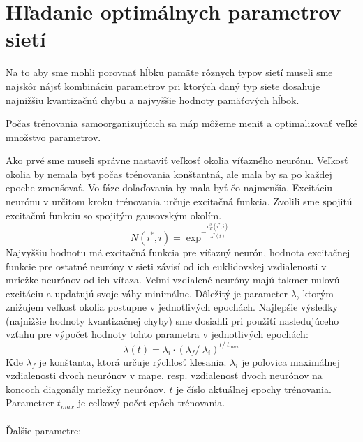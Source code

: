 \section{Hľadanie optimálnych parametrov sietí}
Na to aby sme mohli porovnať hĺbku pamäte rôznych typov sietí museli sme najskôr
nájsť kombináciu parametrov pri ktorých daný typ siete dosahuje najnižšiu kvantizačnú chybu a 
najvyššie hodnoty pamäťových hĺbok. 

Počas trénovania samoorganizujúcich sa máp môžeme meniť a optimalizovať veľké množstvo parametrov. 

Ako prvé sme museli správne nastaviť veľkosť okolia víťazného neurónu.
Veľkosť okolia by nemala byť počas trénovania konštantná, ale mala by sa po každej epoche zmenšovať.
Vo fáze doľaďovania by mala byť čo najmenšia.
Excitáciu neurónu v určitom kroku trénovania určuje excitačná funkcia. Zvolili sme spojitú
excitačnú funkciu so spojitým gausovským okolím. 
\begin{equation}
    N(i^{*}, i) = \exp^{- \frac{d^{2}_{E}(i^{*}, i)}{\lambda^{2}(t)}}
\end{equation}
Najvyššiu hodnotu má excitačná funkcia pre víťazný neurón, hodnota excitačnej funkcie pre ostatné 
neuróny v sieti závisí od ich euklidovskej vzdialenosti v mriežke neurónov od ich víťaza. Veľmi vzdialené neuróny 
majú takmer nulovú excitáciu a updatujú svoje váhy minimálne.
Dôležitý je parameter $\lambda$, ktorým znižujem veľkosť okolia postupne v jednotlivých epochách.
Najlepšie výsledky (najnižšie hodnoty kvantizačnej chyby) sme dosiahli pri použití nasledujúceho vzťahu pre výpočet hodnoty tohto parametra
v jednotlivých epochách:
\begin{equation}
    \lambda{(t)} = \lambda_{i} \cdot (\lambda_{f} /\ \lambda_{i})^{t /\ t_{max}}
\end{equation}
Kde $\lambda_{f}$ je konštanta, ktorá určuje rýchlosť klesania. 
$\lambda_{i}$ je polovica maximálnej vzdialenosti dvoch neurónov v mape, resp. 
vzdialenosť dvoch neurónov na koncoch diagonály mriežky neurónov.
$t$ je číslo aktuálnej epochy trénovania. Parametrer $t_{max}$ je celkový počet 
epôch trénovania.
\\ \\
Ďalšie parametre:

